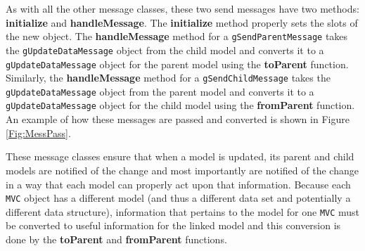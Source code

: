 \documentclass{article}[11pt]
\newcommand{\Rfunction}[1]{{\textbf{#1}}}
\newcommand{\Robject}[1]{{\texttt{#1}}}
\begin{document}
As with all the other message classes, these two send messages have
two methods: \Rfunction{initialize} and \Rfunction{handleMessage}.  The
\Rfunction{initialize} method properly sets the slots of the new object.  The
\Rfunction{handleMessage} method for a \Robject{gSendParentMessage}
takes the \Robject{gUpdateDataMessage} object from the child model
and converts it to a \Robject{gUpdateDataMessage} object for the parent
model using the \Rfunction{toParent} function.  Similarly, the
\Rfunction{handleMessage} method for a \Robject{gSendChildMessage} takes the
\Robject{gUpdateDataMessage} object from the parent model and
converts it to a \Robject{gUpdateDataMessage} object for the child
model using the \Rfunction{fromParent} function.  An example of how
these messages are passed and converted is shown in Figure \ref{Fig:MessPass}.

These message classes ensure that when a model is updated, its parent and
child models are notified of the change and most importantly are
notified of the change in a way that each model can properly act upon that
information.  Because each \Robject{MVC} object has a different model (and
thus a different data set and potentially a different data structure),
information that pertains to the model for one \Robject{MVC} must be converted
to useful information for the linked model and this conversion is done by the
\Rfunction{toParent} and \Rfunction{fromParent} functions.  
\end{document}
